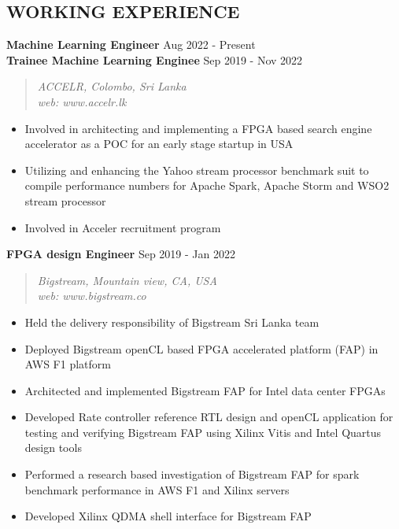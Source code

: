\documentclass[mm]{./assets/res} %
\begin{document}
\begin{resume}

\section{WORKING EXPERIENCE}

\textbf{Machine Learning Engineer} \hfill Aug 2022 - Present\\
\textbf{Trainee Machine Learning Enginee} \hfill Sep 2019 - Nov 2022
\begin{quote}
	\emph{ACCELR, Colombo, Sri Lanka \\
		web: www.accelr.lk}
\end{quote}
\begin{itemize} \itemsep -1pt 
\item Involved in architecting and implementing a FPGA based search engine accelerator as a POC for an early stage startup in USA
\item Utilizing and enhancing the Yahoo stream processor benchmark suit to compile performance numbers for  Apache Spark, Apache Storm and WSO2 stream processor
\item Involved in Acceler recruitment program
\end{itemize}
\textbf{FPGA design Engineer} \hfill Sep 2019 - Jan 2022
\begin{quote}
	\emph{Bigstream, Mountain view, CA, USA\\
		  web: www.bigstream.co}
\end{quote}
\begin{itemize} \itemsep -1pt 
	\item Held the delivery responsibility of Bigstream Sri Lanka team
	\item Deployed Bigstream openCL based FPGA accelerated platform (FAP) in AWS F1 platform
	\item Architected and implemented Bigstream FAP for Intel data center FPGAs
	\item Developed Rate controller reference RTL design and openCL application for testing and verifying Bigstream FAP using Xilinx Vitis and Intel Quartus design tools
	\item Performed a research based investigation of Bigstream FAP for spark benchmark performance in AWS F1 and Xilinx servers
	\item Developed Xilinx QDMA shell interface for Bigstream FAP

\end{itemize}
\end{resume}
\end{document}
